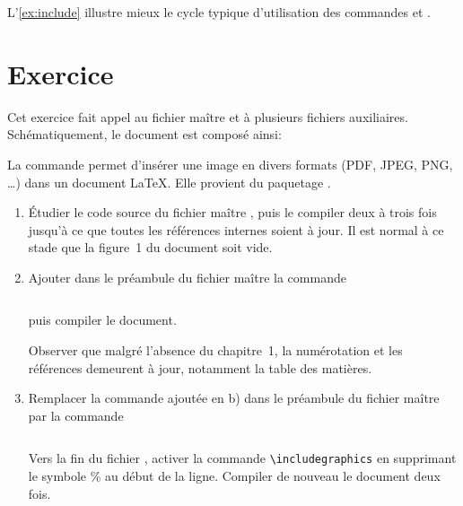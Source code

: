 L'\autoref{ex:include} illustre mieux le cycle typique
d'utilisation des commandes \cmd{} et \cmd{}.




\section{Exercice}
\label{sec:include:exercices}


\begin{exercice}
  \label{ex:include}
  Cet exercice fait appel au fichier maître
   et à plusieurs fichiers auxiliaires.
  Schématiquement, le document est composé ainsi:

  \medskip
  \begin{minipage}{\linewidth}
  \end{minipage}
  \medskip

  La commande  permet d'insérer une image
  en divers formats (PDF, JPEG, PNG, \dots) dans un document {\LaTeX}.
  Elle provient du paquetage .

  \begin{enumerate}
  \item Étudier le code source du fichier maître
    , puis le compiler deux à trois
    fois jusqu'à ce que toutes les références internes soient à jour.
    Il est normal à ce stade que la figure~1 du document soit vide.
  \item Ajouter dans le préambule du fichier maître la commande
\begin{lstlisting}

\end{lstlisting}
    puis compiler le document.

    Observer que malgré l'absence du chapitre~1, la numérotation et
    les références demeurent à jour, notamment la table des matières.
  \item Remplacer la commande ajoutée en b) dans le préambule du
    fichier maître par la commande
\begin{lstlisting}

\end{lstlisting}
    Vers la fin du fichier , activer la
    commande \verb=\includegraphics= en supprimant le symbole \% au
    début de la ligne. Compiler de nouveau le document deux fois.


\end{enumerate}
\end{exercice}
